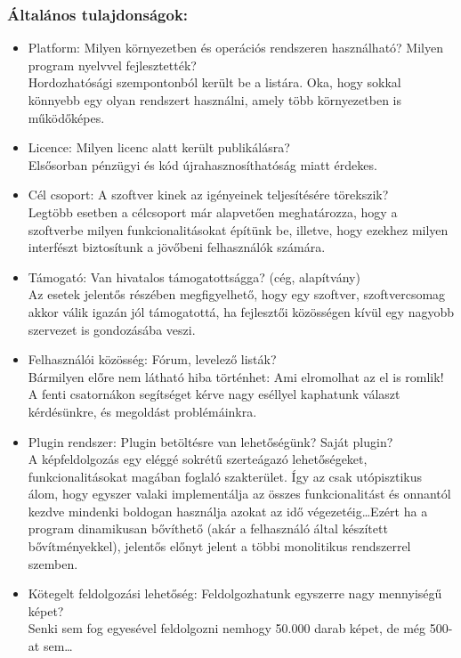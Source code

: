 \documentclass[a4paper,12pt,oneside]{report}
\begin{document}
\subsubsection{Általános tulajdonságok:}
\begin{itemize}
	\itemsep0em
	\item Platform: Milyen környezetben és operációs rendszeren használható? Milyen program nyelvvel fejlesztették? \\Hordozhatósági szempontonból került be a listára. Oka, hogy sokkal könnyebb egy olyan rendszert használni, amely több környezetben is működőképes.
	\item Licence: Milyen licenc alatt került publikálásra?\\Elsősorban pénzügyi és kód újrahasznosíthatóság miatt érdekes.
	\item Cél csoport: A szoftver kinek az igényeinek teljesítésére törekszik?\\Legtöbb esetben a célcsoport már alapvetően meghatározza, hogy a szoftverbe milyen funkcionalitásokat építünk be, illetve, hogy ezekhez milyen interfészt biztosítunk a jövőbeni felhasználók számára.
	\item Támogató: Van hivatalos támogatottságga? (cég, alapítvány)\\Az esetek jelentős részében megfigyelhető, hogy egy szoftver, szoftvercsomag akkor válik igazán jól támogatottá, ha fejlesztői közösségen kívül egy nagyobb szervezet is gondozásába veszi.
	\item Felhasználói közösség: Fórum, levelező listák?\\Bármilyen előre nem látható hiba történhet: Ami elromolhat az el is romlik! A fenti csatornákon segítséget kérve nagy eséllyel kaphatunk választ kérdésünkre, és megoldást problémáinkra.
	\item Plugin rendszer: Plugin betöltésre van lehetőségünk? Saját plugin?\\A képfeldolgozás egy eléggé sokrétű szerteágazó lehetőségeket, funkcionalitásokat magában foglaló szakterület. Így az csak utópisztikus álom, hogy egyszer valaki implementálja az összes funkcionalitást és onnantól kezdve mindenki boldogan használja azokat az idő végezetéig\dots Ezért ha a program dinamikusan bővíthető (akár a felhasználó által készített bővítményekkel), jelentős előnyt jelent a többi monolitikus rendszerrel szemben.
	\item Kötegelt feldolgozási lehetőség: Feldolgozhatunk egyszerre nagy mennyiségű képet?\\Senki sem fog egyesével feldolgozni nemhogy 50.000 darab képet, de még 500-at sem\dots

\end{itemize}
\end{document}
